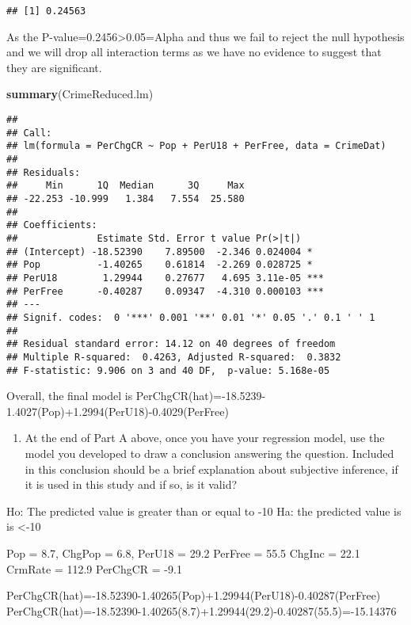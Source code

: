 \documentclass[]{article}
\newenvironment{Shaded}{\begin{snugshade}}{\end{snugshade}}
\newcommand{\KeywordTok}[1]{\textcolor[rgb]{0.13,0.29,0.53}{\textbf{#1}}}
\newcommand{\NormalTok}[1]{#1}
\providecommand{\tightlist}{%
  \setlength{\itemsep}{0pt}\setlength{\parskip}{0pt}}
\begin{document}
\begin{verbatim}
## [1] 0.24563
\end{verbatim}

As the P-value=0.2456\textgreater{}0.05=Alpha and thus we fail to reject
the null hypothesis and we will drop all interaction terms as we have no
evidence to suggest that they are significant.

\begin{Shaded}
\begin{Highlighting}[]
\KeywordTok{summary}\NormalTok{(CrimeReduced.lm)}
\end{Highlighting}
\end{Shaded}

\begin{verbatim}
## 
## Call:
## lm(formula = PerChgCR ~ Pop + PerU18 + PerFree, data = CrimeDat)
## 
## Residuals:
##     Min      1Q  Median      3Q     Max 
## -22.253 -10.999   1.384   7.554  25.580 
## 
## Coefficients:
##              Estimate Std. Error t value Pr(>|t|)    
## (Intercept) -18.52390    7.89500  -2.346 0.024004 *  
## Pop          -1.40265    0.61814  -2.269 0.028725 *  
## PerU18        1.29944    0.27677   4.695 3.11e-05 ***
## PerFree      -0.40287    0.09347  -4.310 0.000103 ***
## ---
## Signif. codes:  0 '***' 0.001 '**' 0.01 '*' 0.05 '.' 0.1 ' ' 1
## 
## Residual standard error: 14.12 on 40 degrees of freedom
## Multiple R-squared:  0.4263, Adjusted R-squared:  0.3832 
## F-statistic: 9.906 on 3 and 40 DF,  p-value: 5.168e-05
\end{verbatim}

Overall, the final model is
PerChgCR(hat)=-18.5239-1.4027(Pop)+1.2994(PerU18)-0.4029(PerFree)

\begin{enumerate}
\def\labelenumi{\Alph{enumi})}
\setcounter{enumi}{1}
\tightlist
\item
  At the end of Part A above, once you have your regression model, use
  the model you developed to draw a conclusion answering the question.
  Included in this conclusion should be a brief explanation about
  subjective inference, if it is used in this study and if so, is it
  valid?
\end{enumerate}

Ho: The predicted value is greater than or equal to -10 Ha: the
predicted value is is \textless{}-10

Pop = 8.7, ChgPop = 6.8, PerU18 = 29.2 PerFree = 55.5 ChgInc = 22.1
CrmRate = 112.9 PerChgCR = -9.1

PerChgCR(hat)=-18.52390-1.40265(Pop)+1.29944(PerU18)-0.40287(PerFree)
PerChgCR(hat)=-18.52390-1.40265(8.7)+1.29944(29.2)-0.40287(55.5)=-15.14376
\end{document}
